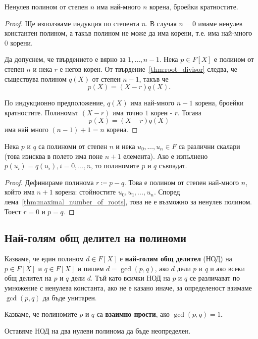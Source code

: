 \documentclass[numbers=endperiod, bibliography=totocnumbered]{scrartcl}
\begin{document}
\begin{lemma}\label{thm:maximal_number_of_roots}
  Ненулев полином от степен \( n \) има най-много \( n \) корена, броейки кратностите.
\end{lemma}
\begin{proof}
  Ще използваме индукция по степента \( n \). В случая \( n = 0 \) имаме ненулев константен полином, а такъв полином не може да има корени, т.е. има най-много \( 0 \) корени.

  Да допуснем, че твърдението е вярно за \( 1, \ldots, n - 1 \). Нека \( p \in F[X] \) е полином от степен \( n \) и нека \( r \) е негов корен. От твърдение~\ref{thm:root_divisor} следва, че съществува полином \( q(X) \) от степен \( n - 1 \), такъв че
  \begin{equation*}
    p(X) = (X - r) q(X).
  \end{equation*}

  По индукционно предположение, \( q(X) \) има най-много \( n - 1 \) корена, броейки кратностите. Полиномът \( (X - r) \) има точно \( 1 \) корен - \( r \). Тогава
  \begin{equation*}
    p(X) = (X - r) q(X)
  \end{equation*}
  има най много \( (n - 1) + 1 = n \) корена.
\end{proof}

\begin{theorem}\label{thm:coefficient_comparison_principle}
  Нека \( p \) и \( q \) са полиноми от степен \( n \) и нека \( u_0, \ldots, u_n \in F \) са различни скалари (това изисква в полето има поне \( n+1 \) елемента). Ако е изпълнено \( p(u_i) = q(u_i), i = 0, \ldots, n \), то полиномите \( p \) и \( q \) съвпадат.
\end{theorem}
\begin{proof}
  Дефинираме полинома \( r \coloneqq p - q \). Това е полином от степен най-много \( n \), който има \( n + 1 \) корена: стойностите \( u_0, u_1, \ldots, u_n \). Според лема~\ref{thm:maximal_number_of_roots}, това не е възможно за ненулев полином. Тоест \( r = 0 \) и \( p = q \).
\end{proof}

\subsection{Най-голям общ делител на полиноми}

\begin{definition}
  Казваме, че един полином \( d \in F[X] \) е \textbf{най-голям общ делител} (НОД) на \( p \in F[X] \) и \( q \in F[X] \) и пишем \( d = \gcd(p, q) \), ако \( d \) дели \( p \) и \( q \) и ако всеки общ делител на \( p \) и \( q \) дели \( d \). Тъй като всички НОД на \( p \) и \( q \) се различават по умножение с ненулева константа, ако не е казано иначе, за определеност взимаме \( \gcd(p, q) \) да бъде унитарен.

  Казваме, че полиномите \( p \) и \( q \) са \textbf{взаимно прости}, ако \( \gcd(p, q) = 1 \).

  Оставяме НОД на два нулеви полинома да бъде неопределен.
\end{definition}
\end{document}
